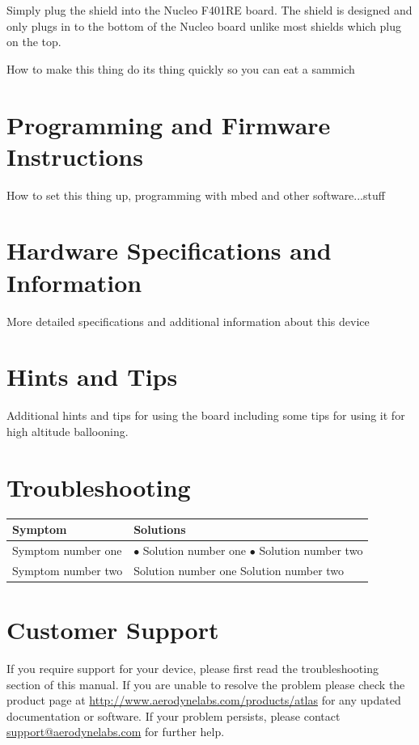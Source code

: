 \documentclass[letterpaper,twoside]{article}
\begin{document}
Simply plug the shield into the Nucleo F401RE board.  The shield is designed and only plugs in to the bottom of the Nucleo board unlike most shields which plug on the top.  

How to make this thing do its thing quickly so you can eat a sammich

\section{Programming and Firmware Instructions}
How to set this thing up, programming with mbed and other software...stuff

\section{Hardware Specifications and Information}
More detailed specifications and additional information about this device

\section{Hints and Tips}
Additional hints and tips for using the board including some tips for using it for high altitude ballooning.

\appendix
\newpage
\section*{Troubleshooting}
\begin{center}
\begin{tabular}{l | p{}}
Symptom & Solutions \\
\hline
Symptom number one &%
$\bullet$ Solution number one\newline
$\bullet$ Solution number two\\
Symptom number two &%
Solution number one\newline
Solution number two
\end{tabular}
\end{center}

\section*{Customer Support}
If you require support for your device, please first read the troubleshooting section of this manual. If you are unable to resolve the problem please check the product page at \url{http://www.aerodynelabs.com/products/atlas} for any updated documentation or software. If your problem persists, please contact \url{support@aerodynelabs.com} for further help.
\end{document}
